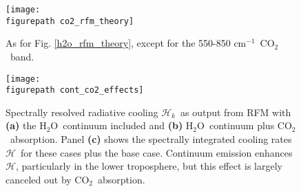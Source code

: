 \documentclass{ametsoc}
\newcommand{\cminverse}{\ensuremath{\mathrm{cm^{-1}}}}
\newcommand{\cotwo}{\ensuremath{\mathrm{CO_2}}}
\newcommand{\htwo}{\ensuremath{\mathrm{H_2O}}}
\newcommand{\ch}{\ensuremath{\mathcal{H}}}
\newcommand{\chk}{\ensuremath{\ch_k}}
\newcommand{\figurepath}{../plots/}
\begin{document}
\begin{figure}[h]
	\begin{center}
			\texttt{[image: \\figurepath co2\_rfm\_theory]}
		\caption{As for Fig. \ref{h2o_rfm_theory}, except for the 550-850 \cminverse\ \cotwo\ band.
		\label{co2_rfm_theory}
		}
	\end{center}
\end{figure}



\begin{figure}[h]
	\begin{center}
			\texttt{[image: \\figurepath cont\_co2\_effects]}
		\caption{Spectrally resolved radiative cooling \chk\ as output from RFM with \textbf{(a)} the \htwo\ continuum included and \textbf{(b)} \htwo\ continuum plus \cotwo\ absorption. Panel \textbf{(c)} shows the spectrally integrated cooling rates \ch\ for these cases plus the base case. Continuum emission enhances \ch, particularly in the lower troposphere, but this effect is largely canceled out by \cotwo\ absorption. 
		\label{cont_co2_effects}
		}
	\end{center}
\end{figure}



\end{document}
